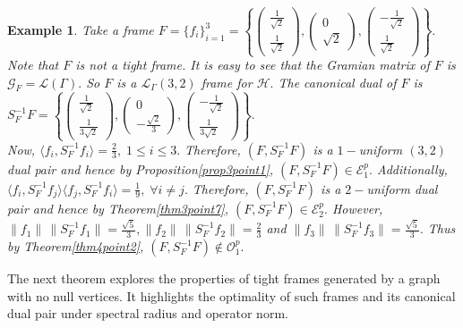 \documentclass[final,1p,times]{elsarticle}
\newtheorem{example}[thm]{Example}
\begin{document}
\begin{example}
	Take a frame $F= \{f_i\}_{i=1}^3 = \left\{ \begin{pmatrix}	\frac{1}{\sqrt{2}}  \\ \frac{1}{\sqrt{2}} \end{pmatrix}, \begin{pmatrix}	0  \\ \sqrt{2} \end{pmatrix}, \begin{pmatrix}	-\frac{1}{\sqrt{2}}  \\ \frac{1}{\sqrt{2}} \end{pmatrix} \right\}.$ Note that $F$ is not a tight frame. It is easy to see that the Gramian matrix of $F$ is $\mathcal{G}_F = \mathcal{L}(\Gamma).$ So $F$ is a $\mathcal{L}_\Gamma(3,2)$ frame for $\mathcal{H}.$ The canonical dual of $F$ is $S_{F}^{-1}F = \left\{ \begin{pmatrix}	\frac{1}{\sqrt{2}}  \\ \frac{1}{3\sqrt{2}} \end{pmatrix}, \begin{pmatrix}	0  \\ -\frac{\sqrt{2}}{3} \end{pmatrix}, \begin{pmatrix}	-\frac{1}{\sqrt{2}}  \\ \frac{1}{3\sqrt{2}} \end{pmatrix} \right\}.$ \\
	Now, $\langle f_i, S_{F}^{-1}f_i \rangle = \frac{2}{3},\;1 \leq i \leq 3.$ Therefore, $(F, S_{F}^{-1}F)$ is a $1-$uniform $(3,2)$ dual pair and hence by Proposition\ref{prop3point1}, $(F, S_{F}^{-1}F) \in \mathcal{E}_{1}^p.$ Additionally, $\langle f_i, S_{F}^{-1}f_j \rangle \langle f_j, S_{F}^{-1}f_i \rangle  = \frac{1}{9},\;\forall i \neq j.$ Therefore, $(F, S_{F}^{-1}F)$ is a $2-$uniform  dual pair and hence by Theorem\ref{thm3point7}, $(F, S_{F}^{-1}F) \in \mathcal{E}_{2}^p.$ However, $\|f_1\|\,\|S_{F}^{-1}f_1\| = \frac{\sqrt{5}}{3}, \|f_2\|\,\|S_{F}^{-1}f_2\| = \frac{2}{3}$ and $ \|f_3\|\,\|S_{F}^{-1}f_3\| = \frac{\sqrt{5}}{3}.  $ Thus by Theorem\ref{thm4point2}, $(F, S_{F}^{-1}F) \notin \mathcal{O}_{1}^p.$
\end{example}


The next theorem explores the properties of tight frames generated by a graph with no null vertices. It highlights the optimality of such frames and its canonical dual pair under spectral radius and operator norm. 
\end{document}
